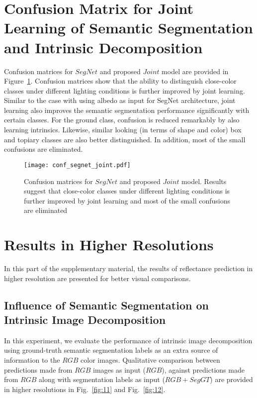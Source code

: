 \documentclass[runningheads]{llncs}
\begin{document}
\newpage

\section{Confusion Matrix for Joint Learning of Semantic Segmentation and Intrinsic Decomposition}
Confusion matrices for $SegNet$ and proposed $Joint$ model are provided in Figure~\ref{fig:cm2}. Confusion matrices show that the ability to distinguish close-color classes under different lighting conditions is further improved by joint learning. Similar to the case with using albedo as input for SegNet architecture, joint learning also improves the semantic segmentation performance significantly with certain classes. For the ground class, confusion is reduced remarkably by also learning intrinsics. Likewise, similar looking (in terms of shape and color) box and topiary classes are also better distinguished. In addition, most of the small confusions are eliminated.

\begin{figure}[h]
    \centering
    \texttt{[image: conf\_segnet\_joint.pdf]}
    \caption{Confusion matrices for $SegNet$ and proposed $Joint$ model. Results suggest that close-color classes under different lighting conditions is further improved by joint learning and most of the small confusions are eliminated}
    \label{fig:cm2}
\end{figure}

\section{Results in Higher Resolutions}
In this part of the supplementary material, the results of reflectance prediction in higher resolution are presented for better visual comparisons.

\subsection{Influence of Semantic Segmentation on Intrinsic Image Decomposition}
In this experiment, we evaluate the performance of intrinsic image decomposition using ground-truth semantic segmentation labels as an extra source of information to the $RGB$ color images. Qualitative comparison between predictions made from $RGB$ images as input ($RGB$), against predictions made from $RGB$ along with segmentation labels as input ($RGB+SegGT$) are provided in higher resolutions in Fig.~\ref{fig:11} and Fig.~\ref{fig:12}.
\end{document}
